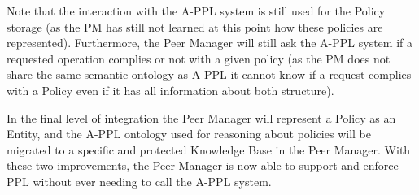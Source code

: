 Note that the interaction with the A-PPL system is still used for the Policy storage (as the PM has still not learned at this point how these policies are represented). Furthermore, the Peer Manager will still ask the A-PPL system if a requested operation complies or not with a given policy (as the PM does not share the same semantic ontology as A-PPL it cannot know if a request complies with a Policy even if it has all information about both structure).

In the final level of integration the Peer Manager will represent a Policy as an Entity, and the A-PPL ontology used for reasoning about policies will be migrated to a specific and protected Knowledge Base in the Peer Manager.
With these two improvements, the Peer Manager is now able to support and enforce PPL without ever needing to call the A-PPL system. 


